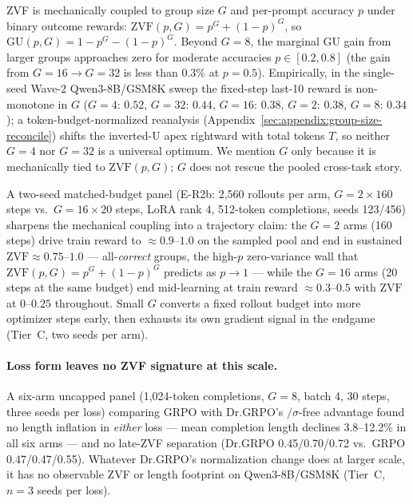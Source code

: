 \documentclass{article}
\begin{document}
ZVF is mechanically coupled to group size $G$ and per-prompt accuracy $p$
under binary outcome rewards:
$\mathrm{ZVF}(p, G) = p^G + (1-p)^G$, so
$\mathrm{GU}(p, G) = 1 - p^G - (1-p)^G$. Beyond $G{=}8$, the marginal GU
gain from larger groups approaches zero for moderate accuracies $p \in
[0.2, 0.8]$ (the gain from $G{=}16 \to G{=}32$ is less than $0.3\%$ at
$p{=}0.5$). Empirically, in the single-seed Wave-2 Qwen3-8B/GSM8K sweep
the fixed-step last-10 reward is non-monotone in $G$
($G{=}4{:}\,0.52$, $G{=}32{:}\,0.44$, $G{=}16{:}\,0.38$, $G{=}2{:}\,0.38$,
$G{=}8{:}\,0.34$); a token-budget-normalized reanalysis
(Appendix~\ref{sec:appendix:group-size-reconcile}) shifts the inverted-U
apex rightward with total tokens $T$, so neither $G{=}4$ nor $G{=}32$ is
a universal optimum. We mention $G$ only because it is mechanically tied
to $\mathrm{ZVF}(p,G)$; $G$ does not rescue the pooled cross-task story.

A two-seed matched-budget panel (E-R2b: 2{,}560 rollouts per arm,
$G{=}2\times160$ steps vs.\ $G{=}16\times20$ steps, LoRA rank 4, 512-token
completions, seeds 123/456) sharpens the mechanical coupling into a
trajectory claim: the $G{=}2$ arms (160 steps) drive train reward to
$\approx0.9$--$1.0$ on the sampled pool and end in sustained
$\mathrm{ZVF}\approx0.75$--$1.0$ --- all-\emph{correct} groups, the
high-$p$ zero-variance wall that $\mathrm{ZVF}(p,G)=p^G+(1-p)^G$ predicts
as $p\to1$ --- while the $G{=}16$ arms (20 steps at the same budget) end
mid-learning at train reward $\approx0.3$--$0.5$ with $\mathrm{ZVF}$ at
$0$--$0.25$ throughout. Small $G$ converts a fixed rollout budget into more optimizer
steps early, then exhausts its own gradient signal in the endgame
(Tier~C, two seeds per arm).

\paragraph{Loss form leaves no ZVF signature at this scale.} A six-arm
uncapped panel (1{,}024-token completions, $G{=}8$, batch 4, 30 steps,
three seeds per loss) comparing GRPO with Dr.GRPO's $/\sigma$-free
advantage found no length inflation in \emph{either} loss --- mean
completion length declines 3.8--12.2\% in all six arms --- and no late-ZVF
separation (Dr.GRPO 0.45/0.70/0.72 vs.\ GRPO 0.47/0.47/0.55). Whatever
Dr.GRPO's normalization change does at larger scale, it has no observable
ZVF or length footprint on Qwen3-8B/GSM8K (Tier~C, $n{=}3$ seeds per
loss).

\end{document}
